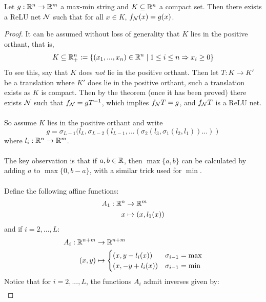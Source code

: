 %
\begin{lemma}
\label{maxmin}
Let $g: \mathbb{R}^n \to \mathbb{R}^m$ a max-min string and $K \subseteq \mathbb{R}^n$ a compact set. Then there exists a ReLU net $\mathcal{N}$ such that for all $x \in K$, $f_{\mathcal{N}}(x) = g(x)$.
\end{lemma}
\begin{proof}
It can be assumed without loss of generality that $K$ lies in the positive orthant, that is,
\begin{equation*}
    K \subseteq \mathbb{R}_+^n := \lbrace (x_1,...,x_n) \in \mathbb{R}^n \mid 1 \leq i \leq n \Rightarrow x_i \geq 0 \rbrace
\end{equation*}
To see this, say that $K$ does \emph{not} lie in the positive orthant. Then let $T: K \to K'$ be a translation where $K'$ does lie in the positive orthant, such a translation exists as $K$ is compact. Then by the theorem (once it has been proved) there exists $\mathcal{N}$ such that $f_{\mathcal{N}} = gT^{-1}$, which implies $f_{\mathcal{N}} T = g$, and $f_{\mathcal{N}} T$ is a ReLU net.\\\\
%
So assume $K$ lies in the positive orthant and write $$g = \sigma_{L-1}(l_L,\sigma_{L-2}(l_{L-1},...(\sigma_2(l_3,\sigma_1(l_2,l_1))...))$$
where $l_i: \mathbb{R}^{n} \to \mathbb{R}^{m}$.\\\\
%
The key observation is that if $a,b \in \mathbb{R}$, then $\operatorname{max}\lbrace a,b\rbrace$ can be calculated by adding $a$ to $\operatorname{max}\lbrace 0, b - a\rbrace$, with a similar trick used for $\operatorname{min}$.\\\\
%
Define the following affine functions:
\begin{align*}
    A_1: \mathbb{R}^n &\to \mathbb{R}^m\\
    x &\mapsto (x,l_1(x))
\end{align*}
and if $i = 2,...,L$:
\begin{align*}
    A_i: \mathbb{R}^{n + m} &\to \mathbb{R}^{n + m}\\
    (x,y) &\mapsto 
    \begin{cases}
    (x, y - l_i(x))& \sigma_{i-1} = \operatorname{max}\\
    (x, -y + l_i(x))& \sigma_{i-1} = \operatorname{min}
    \end{cases}
\end{align*}
Notice that for $i = 2,...,L$, the functions $A_i$ admit inverses given by:
\begin{align*}

\end{align*}
\end{proof}
